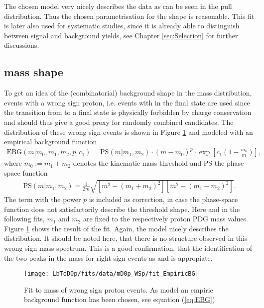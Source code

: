 The chosen model very nicely describes the data as can be seen in the pull distribution.
Thus the chosen parametrisation for the \logIP shape is reasonable.
This fit is later also used for systematic studies, since it is already able to distinguish between signal and background yields, see Chapter \ref{sec:Selection} for further discussions.

\subsection{\Dz\proton mass shape}
\label{sec:Shape_mD0p}
To get an idea of the (combinatorial) background shape in the \Dz\proton mass distribution, events with a wrong sign proton, i.e. events with \Dz\antiproton\mun in the final state are used since the transition from \Lb to a \Dz\antiproton\mun final state is physically forbidden by charge
conservation and should thus give a good proxy for randomly combined \LbToDpmunu candidates. 
The \MDp distribution of these wrong sign events is shown in Figure \ref{fig:fit_mD0p_WS} and modeled with an empirical background function \cite{EBG}
\begin{align}
    \text{EBG}(m|m_0, m_1, m_2, p,c_1) = \text{PS}(m|m_1,m_2) \cdot (m - m_0)^p \cdot \exp\left[ c_1 \left(1-\frac{m_0}{m}\right)\right], \label{eq:EBG}
\end{align}
where $m_0 := m_1 + m_2$ denotes the kinematic \Dz\proton mass threshold and PS the phase space function
\begin{align}
    \text{PS}(m|m_1,m_2) = \frac{1}{2m} \sqrt{\left[m^2 - (m_1 + m_2)^2\right] \left[m^2 - (m_1 - m_2)^2\right]}. \label{eq:PS}
\end{align}
The term with the power $p$ is included as correction, in case the phase-space function does not satisfactorily describe the threshold shape.
Here and in the following fits, $m_1$ and $m_2$ are fixed to the \Dz respectively proton PDG mass values.
Figure \ref{fig:fit_mD0p_WS} shows the result of the fit.
Again, the model nicely describes the distribution.
It should be noted here, that there is no structure observed in this wrong sign mass spectrum.
This is a good confirmation, that the identification of the two peaks in the \Dz\proton mass for right sign events as \LcResI and \LcResII is appropiate.
\begin{figure}[tb]
    \centering
	\texttt{[image: LbToD0p/fits/data/mD0p\_WSp/fit\_EmpiricBG]}
	\caption{Fit to \Dz\proton mass of wrong sign proton events.
             As model an empiric background function has been chosen, see equation (\ref{eq:EBG})}
    \label{fig:fit_mD0p_WS}
\end{figure}

